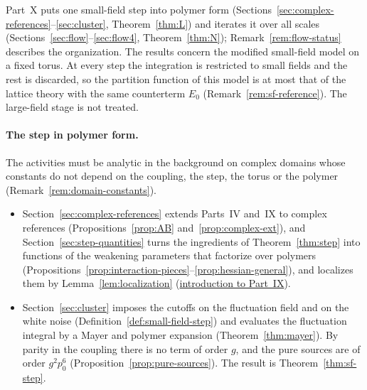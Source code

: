 \label{intro:X}
Part~X puts one small-field step into polymer form (Sections~\ref{sec:complex-references}--\ref{sec:cluster}, Theorem~\ref{thm:L}) and iterates it over all scales (Sections~\ref{sec:flow}--\ref{sec:flow4}, Theorem~\ref{thm:N}); Remark~\ref{rem:flow-status} describes the organization. The results concern the modified small-field model on a fixed torus. At every step the integration is restricted to small fields and the rest is discarded, so the partition function of this model is at most that of the lattice theory with the same counterterm $E_0$ (Remark~\ref{rem:sf-reference}). The large-field stage is not treated.

\paragraph{The step in polymer form.} The activities must be analytic in the background on complex domains whose constants do not depend on the coupling, the step, the torus or the polymer (Remark~\ref{rem:domain-constants}).
\begin{itemize}
\item Section~\ref{sec:complex-references} extends Parts~IV and~IX to complex references (Propositions~\ref{prop:AB} and~\ref{prop:complex-ext}), and Section~\ref{sec:step-quantities} turns the ingredients of Theorem~\ref{thm:step} into functions of the weakening parameters that factorize over polymers (Propositions~\ref{prop:interaction-pieces}--\ref{prop:hessian-general}), and localizes them by Lemma~\ref{lem:localization} (\hyperref[intro:IX]{introduction to Part~IX}).
\item Section~\ref{sec:cluster} imposes the cutoffs on the fluctuation field and on the white noise (Definition~\ref{def:small-field-step}) and evaluates the fluctuation integral by a Mayer and polymer expansion (Theorem~\ref{thm:mayer}). By parity in the coupling there is no term of order $g$, and the pure sources are of order $g^2p_0^6$ (Proposition~\ref{prop:pure-sources}). The result is Theorem~\ref{thm:sf-step}.
\end{itemize}

